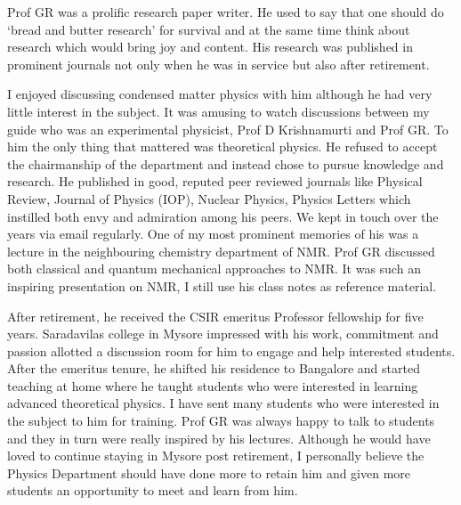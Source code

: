 Prof GR was a prolific research paper writer. He used to say that one should do `bread and butter research' for survival and at the same time think about research which would bring joy and content. His research was published in prominent journals not only when he was in service but also after retirement.

I enjoyed discussing condensed matter physics with him although he had very little interest in the subject. It was
amusing to watch discussions between my guide who was an experimental physicist, Prof D Krishnamurti and
Prof GR. To him the only thing that mattered was theoretical physics. He refused to accept the chairmanship
of the department and instead chose to pursue knowledge and research. He published in good, reputed peer
reviewed journals like Physical Review, Journal of Physics (IOP), Nuclear Physics, Physics Letters which instilled
both envy and admiration among his peers. We kept in touch over the years via email regularly. One of my most
prominent memories of his was a lecture in the neighbouring chemistry department of NMR. Prof GR discussed 
both classical and quantum mechanical approaches to NMR. It was such an inspiring presentation on NMR, I still
use his class notes as reference material.

After retirement, he received the CSIR emeritus Professor fellowship for five years. Saradavilas college in
Mysore impressed with his work, commitment and passion allotted a discussion room for him to engage and
help interested students. After the emeritus tenure, he shifted his residence to Bangalore and started teaching at
home where he taught students who were interested in learning advanced theoretical physics. I have sent many
students who were interested in the subject to him for training. Prof GR was always happy to talk to students and
they in turn were really inspired by his lectures. Although he would have loved to continue staying in Mysore post
retirement, I personally believe the Physics Department should have done more to retain him and given more
students an opportunity to meet and learn from him.

